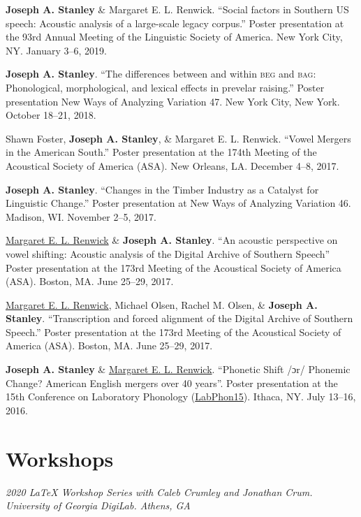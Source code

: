 \documentclass[
]{article}
\begin{document}
\textbf{Joseph A. Stanley} \& Margaret E. L. Renwick. ``Social factors
in Southern US speech: Acoustic analysis of a large-scale legacy
corpus.'' Poster presentation at the 93rd Annual Meeting of the
Linguistic Society of America. New York City, NY. January 3--6, 2019.

\textbf{Joseph A. Stanley}. ``The differences between and within
\textsc{beg} and \textsc{bag}: Phonological, morphological, and lexical
effects in prevelar raising.'' Poster presentation New Ways of Analyzing
Variation 47. New York City, New York. October 18--21, 2018.

{Shawn Foster}, \textbf{Joseph A. Stanley}, \& Margaret E. L. Renwick.
``Vowel Mergers in the American South.'' Poster presentation at the
174th Meeting of the Acoustical Society of America (ASA). New Orleans,
LA. December 4--8, 2017.

\textbf{Joseph A. Stanley}. ``Changes in the Timber Industry as a
Catalyst for Linguistic Change.'' Poster presentation at New Ways of
Analyzing Variation 46. Madison, WI. November 2--5, 2017.

\href{http://faculty.franklin.uga.edu/mrenwick/}{Margaret E. L. Renwick}
\& \textbf{Joseph A. Stanley}. ``An acoustic perspective on vowel
shifting: Acoustic analysis of the Digital Archive of Southern Speech''
Poster presentation at the 173rd Meeting of the Acoustical Society of
America (ASA). Boston, MA. June 25--29, 2017.

\href{http://faculty.franklin.uga.edu/mrenwick/}{Margaret E. L.
Renwick}, Michael Olsen, Rachel M. Olsen, \& \textbf{Joseph A. Stanley}.
``Transcription and forced alignment of the Digital Archive of Southern
Speech.'' Poster presentation at the 173rd Meeting of the Acoustical
Society of America (ASA). Boston, MA. June 25--29, 2017.

\textbf{Joseph A. Stanley} \&
\href{http://faculty.franklin.uga.edu/mrenwick/}{Margaret E. L.
Renwick}. ``Phonetic Shift {/ɔr/} Phonemic Change? American English
mergers over 40 years''. Poster presentation at the 15th Conference on
Laboratory Phonology (\href{http://labphon.org/labphon15/}{LabPhon15}).
Ithaca, NY. July 13--16, 2016.

\hypertarget{workshops}{%
\section{Workshops}\label{workshops}}

\emph{2020 LaTeX Workshop Series with Caleb Crumley and Jonathan Crum.
University of Georgia DigiLab. Athens, GA}
\end{document}
